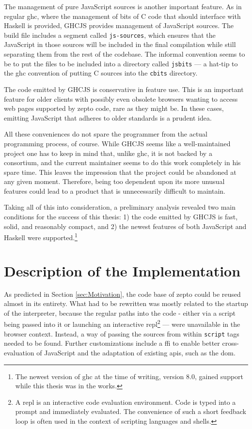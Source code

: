 \documentclass[oneside,11pt,xetex]{scrbook}
\begin{document}
The management of pure JavaScript sources is another important feature. As in regular \gls{ghc},
where the management of bits of C code that should interface with Haskell is provided, GHCJS
provides management of JavaScript sources. The build file includes a segment called
\texttt{js-sources}, which ensures that the JavaScript in those sources will be included in the
final compilation while still separating them from the rest of the codebase. The informal convention
seems to be to put the files to be included into a directory called \texttt{jsbits} --- a hat-tip
to the \gls{ghc} convention of putting C sources into the \texttt{cbits} directory.

The code emitted by GHCJS is conservative in feature use. This is an important feature for
older clients with possibly even obsolete browsers wanting to access web pages supported by
zepto code, rare as they might be. In these cases, emitting JavaScript that adheres to older
standards is a prudent idea.

All these conveniences do not spare the programmer from the actual programming process, of course.
While GHCJS seems like a well-maintained project one has to keep in mind that, unlike \gls{ghc},
it is not backed by a consortium, and the current maintainer seems to do this work completely
in his spare time. This leaves the impression that the project could be abandoned at any given
moment. Therefore, being too dependent upon its more unusual features could lead to a product that
is unnecessarily difficult to maintain.

Taking all of this into consideration, a preliminary analysis revealed two main conditions for
the success of this thesis: 1) the code emitted by GHCJS is fast, solid, and reasonably compact,
and 2) the newest features of both JavaScript and Haskell were supported.\footnote{The newest version
of \gls{ghc} at the time of writing, version 8.0, gained support while this thesis was in the works.}

\section{Description of the Implementation}

As predicted in Section \ref{sec:Motivation}, the code base of zepto could be reused almost in its entirety.
What had to be rewritten was mostly related to the startup of the interpreter, because the regular
paths into the code - either via a script being passed into it or launching an interactive
\gls{repl}\footnote{A \gls{repl} is an interactive code evaluation environment. Code is typed into
a prompt and immediately evaluated. The convenience of such a short feedback loop is often used
in the context of scripting languages and shells.} --- were unavailable in the browser context.
Instead, a way of passing the sources from within \texttt{script} tags needed to be found. Further
customizations include a \gls{ffi} to enable better cross-evaluation of JavaScript and the adaptation
of existing \gls{api}s, such as the \gls{dom}.
\end{document}
